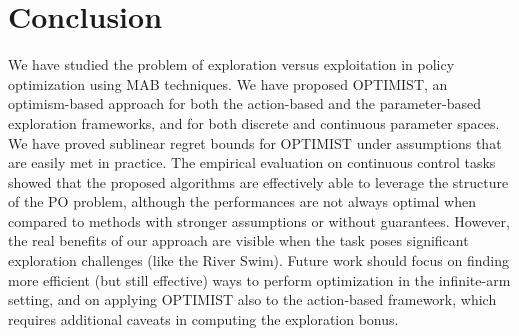\documentclass{article}
\begin{document}
\section{Conclusion}\label{sec:end}
We have studied the problem of exploration versus exploitation in policy optimization using MAB techniques. We have proposed OPTIMIST, an optimism-based approach for both the action-based and the parameter-based exploration frameworks, and for both discrete and continuous parameter spaces. We have proved sublinear regret bounds for OPTIMIST under assumptions that are easily met in practice. The empirical evaluation on continuous control tasks showed that the proposed algorithms are effectively able to leverage the structure of the PO problem, although the performances are not always optimal when compared to methods with stronger assumptions or without guarantees. However, the real benefits of our approach are visible when the task poses significant exploration challenges (like the River Swim).
Future work should focus on finding more efficient (but still effective) ways to perform optimization in the infinite-arm setting, and on applying OPTIMIST also to the action-based framework, which requires additional caveats in computing the exploration bonus.

%
%





\clearpage
\onecolumn
\appendix
\end{document}

